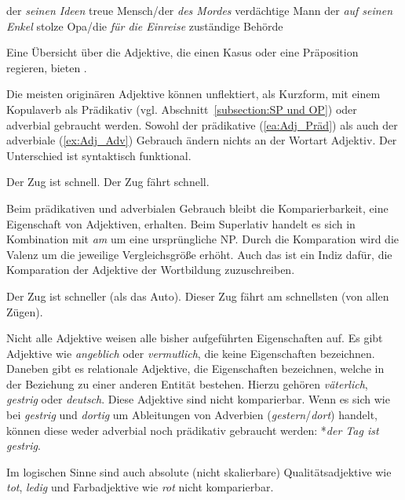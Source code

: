 \ea \label{ea:Adjektivergänzungen}
\ea \label{ea:Adj_Kasus} der \textit{seinen Ideen} treue Mensch/der \textit{des Mordes} verdächtige Mann 
\ex \label{ex:Adj_Präp} der \textit{auf seinen Enkel} stolze Opa/die \textit{für die Einreise} zuständige Behörde
\z 
\z 

Eine Übersicht über die Adjektive, die einen Kasus oder eine Präposition regieren, bieten \citet[288--290]{HelbigBuscha}.

Die meisten originären Adjektive können unflektiert, als Kurzform, mit einem Kopulaverb als Prädikativ (vgl. Abschnitt~\ref{subsection:SP und OP}) oder adverbial gebraucht werden. Sowohl der prädikative (\ref{ea:Adj_Präd}) als auch der adverbiale (\ref{ex:Adj_Adv}) Gebrauch ändern nichts an der Wortart Adjektiv. Der Unterschied ist syntaktisch funktional.

\ea \label{ea:Adj_Adv_Präd}
\ea \label{ea:Adj_Präd} Der Zug ist schnell.
\ex \label{ex:Adj_Adv} Der Zug fährt schnell.
\z 
\z 

Beim prädikativen und adverbialen Gebrauch bleibt die Komparierbarkeit, eine Eigenschaft von Adjektiven, erhalten. Beim Superlativ handelt es sich in Kombination mit \textit{am} um eine ursprüngliche NP. Durch die Komparation wird die Valenz um die jeweilige Vergleichsgröße erhöht. Auch das ist ein Indiz dafür, die Komparation der Adjektive der Wortbildung zuzuschreiben.  

\ea \label{ea:Adj_Adv_Präd_Komp}
\ea \label{ea:Adj_Präd_Komp} Der Zug ist schneller (als das Auto).
\ex \label{ex:Adj_Adv_Sup} Dieser Zug fährt am schnellsten (von allen Zügen).
\z 
\z 

Nicht alle Adjektive weisen alle bisher aufgeführten Eigenschaften auf. Es gibt Adjektive wie \textit{angeblich} oder \textit{vermutlich}, die keine Eigenschaften bezeichnen. Daneben gibt es relationale Adjektive, die Eigenschaften bezeichnen, welche in der Beziehung zu einer anderen Entität bestehen. Hierzu gehören \zB \textit{väterlich}, \textit{gestrig} oder \textit{deutsch}. Diese Adjektive sind nicht komparierbar. Wenn es sich wie bei \textit{gestrig} und \textit{dortig} um Ableitungen von Adverbien (\textit{gestern}/\textit{dort}) handelt, können diese weder adverbial noch prädikativ gebraucht werden: *\textit{der Tag ist gestrig}.     

Im logischen Sinne sind auch absolute (nicht skalierbare) Qualitätsadjektive wie \textit{tot}, \textit{ledig} und Farbadjektive wie \textit{rot} nicht komparierbar. 

